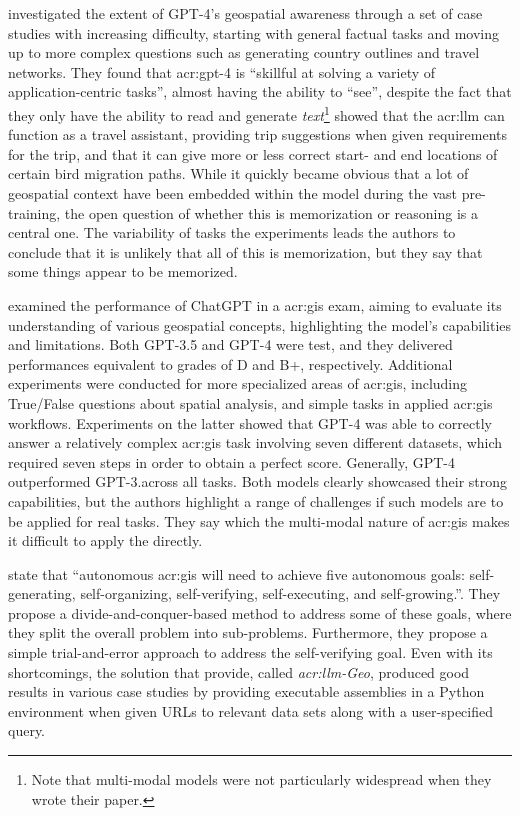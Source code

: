 \cite{robertsGPT4GEOHowLanguage2023} investigated the extent of GPT-4's geospatial awareness through a set of case studies with increasing difficulty, starting with general factual tasks and moving up to more complex questions such as generating country outlines and travel networks. They found that \acrshort{acr:gpt}-4 is \enquote{skillful at solving a variety of application-centric tasks}, almost having the ability to \enquote{see}, despite the fact that they only have the ability to read and generate \textit{text}\footnote{Note that multi-modal models were not particularly widespread when they wrote their paper.} \citeauthor{robertsGPT4GEOHowLanguage2023} showed that the \acrshort{acr:llm} can function as a travel assistant, providing trip suggestions when given requirements for the trip, and that it can give more or less correct start- and end locations of certain bird migration paths. While it quickly became obvious that a lot of geospatial context have been embedded within the model during the vast pre-training, the open question of whether this is memorization or reasoning is a central one. The variability of tasks the experiments leads the authors to conclude that it is unlikely that all of this is memorization, but they say that some things appear to be memorized.

\cite{mooneyUnderstandingGeospatialSkills2023} examined the performance of ChatGPT in a \acrshort{acr:gis} exam, aiming to evaluate its understanding of various geospatial concepts, highlighting the model's capabilities and limitations. Both GPT-3.5 and GPT-4 were test, and they delivered performances equivalent to grades of D and B+, respectively. Additional experiments were conducted for more specialized areas of \acrshort{acr:gis}, including True/False questions about spatial analysis, and simple tasks in applied \acrshort{acr:gis} workflows. Experiments on the latter showed that GPT-4 was able to correctly answer a relatively complex \acrshort{acr:gis} task involving seven different datasets, which required seven steps in order to obtain a perfect score. Generally, GPT-4 outperformed GPT-3.across all tasks. Both models clearly showcased their strong capabilities, but the authors highlight a range of challenges if such models are to be applied for real tasks. They say which the multi-modal nature of \acrshort{acr:gis} makes it difficult to apply the  directly.

\cite{liAutonomousGISNextgeneration2023} state that \enquote{autonomous \acrshort{acr:gis} will need to achieve five autonomous goals: self-generating, self-organizing, self-verifying, self-executing, and self-growing.}. They propose a divide-and-conquer-based method to address some of these goals, where they split the overall problem into sub-problems. Furthermore, they propose a simple trial-and-error approach to address the self-verifying goal. Even with its shortcomings, the solution that \cite{liAutonomousGISNextgeneration2023} provide, called \textit{\acrshort{acr:llm}-Geo}, produced good results in various case studies by providing executable assemblies in a Python environment when given URLs to relevant data sets along with a user-specified query.

